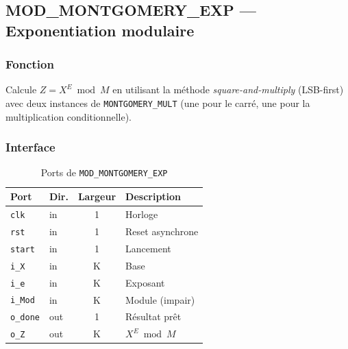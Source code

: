 \documentclass[12pt,a4paper]{report}
\begin{document}
\subsection{MOD\_MONTGOMERY\_EXP --- Exponentiation modulaire}
\label{sec:mod_exp}

\subsubsection{Fonction}
Calcule $Z = X^E \bmod M$ en utilisant la méthode \textit{square-and-multiply}
(LSB-first) avec deux instances de \texttt{MONTGOMERY\_MULT} (une pour le
carré, une pour la multiplication conditionnelle).

\subsubsection{Interface}
\begin{table}[H]
\centering
\caption{Ports de \texttt{MOD\_MONTGOMERY\_EXP}}
\begin{tabular}{llcp{5cm}}
\toprule
\textbf{Port} & \textbf{Dir.} & \textbf{Largeur} & \textbf{Description} \\
\midrule
\texttt{clk}    & in  & 1 & Horloge \\
\texttt{rst}    & in  & 1 & Reset asynchrone \\
\texttt{start}  & in  & 1 & Lancement \\
\texttt{i\_X}   & in  & K & Base \\
\texttt{i\_e}   & in  & K & Exposant \\
\texttt{i\_Mod} & in  & K & Module (impair) \\
\texttt{o\_done} & out & 1 & Résultat prêt \\
\texttt{o\_Z}    & out & K & $X^E \bmod M$ \\
\bottomrule
\end{tabular}
\end{table}
\end{document}
